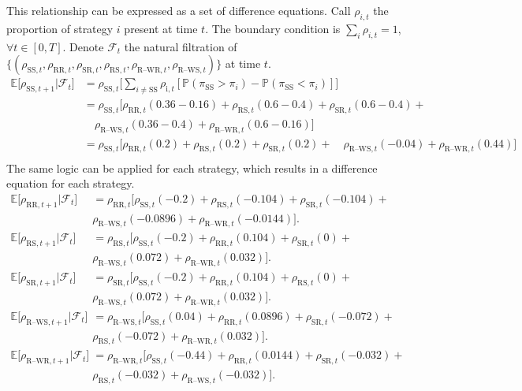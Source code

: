 This relationship can be expressed as a set of difference equations. Call $\rho_{i,t}$ the proportion of strategy $i$ present at time $t$. The boundary condition is $\sum_i \rho_{i,t}= 1$, $\forall t \in [0,T]$. Denote $\mathcal F_{t}$ the natural filtration of $\{(\rho_{\text{SS},t}, \rho_{\text{RR},t}, \rho_{\text{SR},t}, \rho_{\text{RS},t}, \rho_{\text{R--WR},t}, \rho_{\text{R--WS},t} ) \}$ at time $t$. 
\begin{align*}
    \mathbb E \big [\rho_{\text{SS},t+1}| \mathcal F_t \big ] &= \rho_{\text{SS},t} \Bigg [\sum_{ i \neq \text{SS}}  \rho_{\text{i},t} [\mathbb P (\pi_\text{SS} > \pi_{i}) -\mathbb P (\pi_\text{SS} < \pi_{i}) ] \Bigg ] \\
    &= \rho_{\text{SS},t}\Bigg [\rho_{\text{RR}, t}(0.36-0.16) + \rho_{\text{RS}, t}(0.6-0.4) + \rho_{\text{SR}, t}(0.6-0.4) + \\
     & \quad \rho_{\text{R--WS}, t}(0.36-0.4) + \rho_{\text{R--WR}, t}(0.6-0.16) \Bigg ] \\
    &= \rho_{\text{SS},t}\Bigg [\rho_{\text{RR}, t}(0.2) + \rho_{\text{RS}, t}(0.2) + \rho_{\text{SR}, t}(0.2) + 
      \quad \rho_{\text{R--WS}, t}(-0.04) + \rho_{\text{R--WR}, t}(0.44) \Bigg ] \\
\end{align*}
The same logic can be applied for each strategy, which results in a difference equation for each strategy.
\begin{align*}
    \mathbb E \big [\rho_{\text{RR},t+1}| \mathcal F_t \big ] &=\rho_{\text{RR},t}\Bigg [\rho_{\text{SS}, t}(-0.2) + \rho_{\text{RS}, t}(-0.104) +  \rho_{\text{SR}, t}(-0.104) + \\ & \rho_{\text{R--WS}, t}(-0.0896) + \rho_{\text{R--WR}, t}(-0.0144) \Bigg ]. \\
    \mathbb E \big [\rho_{\text{RS},t+1}| \mathcal F_t \big ] &=\rho_{\text{RS},t}\Bigg [\rho_{\text{SS}, t}(-0.2) + \rho_{\text{RR}, t}(0.104) +  \rho_{\text{SR}, t}(0) + \\ & \rho_{\text{R--WS}, t}(0.072) + \rho_{\text{R--WR}, t}(0.032) \Bigg ] .\\
    \mathbb E \big [\rho_{\text{SR},t+1}| \mathcal F_t \big ] &=\rho_{\text{SR},t}\Bigg [\rho_{\text{SS}, t}(-0.2) + \rho_{\text{RR}, t}(0.104) +  \rho_{\text{RS}, t}(0) + \\ & \rho_{\text{R--WS}, t}(0.072) + \rho_{\text{R--WR}, t}(0.032) \Bigg ] .\\
    \mathbb E \big [\rho_{\text{R--WS},t+1}| \mathcal F_t \big ] &=\rho_{\text{R--WS},t}\Bigg [\rho_{\text{SS}, t}(0.04) + \rho_{\text{RR}, t}(0.0896) +  \rho_{\text{SR}, t}(-0.072) + \\ & \rho_{\text{RS}, t}(-0.072) + \rho_{\text{R--WR}, t}(0.032) \Bigg ] . \\
\mathbb E \big [\rho_{\text{R--WR},t+1}| \mathcal F_t \big ] &=\rho_{\text{R--WR},t}\Bigg [\rho_{\text{SS}, t}(-0.44) + \rho_{\text{RR}, t}(0.0144) +  \rho_{\text{SR}, t}(-0.032) + \\ & \rho_{\text{RS}, t}(-0.032) +\rho_{\text{R--WS}, t}(-0.032)  \Bigg ] . \\    
\end{align*}

